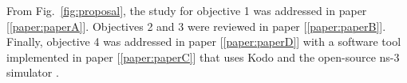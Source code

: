 From Fig.~\ref{fig:proposal}, the study for objective 1 was addressed in paper {[\ref{paper:paperA}]}. Objectives 2 and 3 were reviewed in paper {[\ref{paper:paperB}]}. Finally, objective 4 was addressed in paper {[\ref{paper:paperD}]} with a software tool implemented in paper {[\ref{paper:paperC}]} that uses Kodo and the open-source ns-3 simulator \cite{ns3link}.

\clearpage
